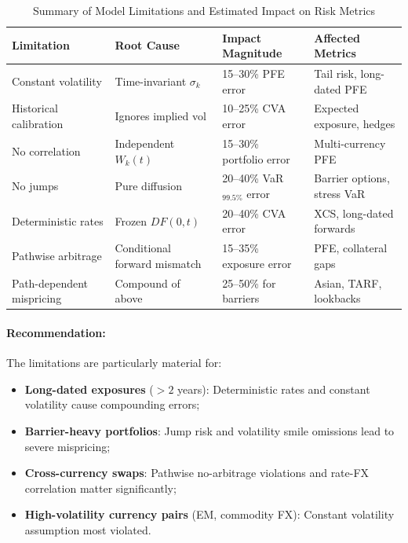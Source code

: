 \begin{table}[h!]
	\centering
	\small
	\begin{tabular}{|p{4cm}|p{3.5cm}|p{3cm}|p{3cm}|}
		\hline
		\textbf{Limitation} & \textbf{Root Cause} & \textbf{Impact Magnitude} & \textbf{Affected Metrics} \\
		\hline
		Constant volatility & Time-invariant $\sigma_k$ & 15--30\% PFE error & Tail risk, long-dated PFE \\
		\hline
		Historical calibration & Ignores implied vol & 10--25\% CVA error & Expected exposure, hedges \\
		\hline
		No correlation & Independent $W_k(t)$ & 15--30\% portfolio error & Multi-currency PFE \\
		\hline
		No jumps & Pure diffusion & 20--40\% VaR$_{99.5\%}$ error & Barrier options, stress VaR \\
		\hline
		Deterministic rates & Frozen $DF(0,t)$ & 20--40\% CVA error & XCS, long-dated forwards \\
		\hline
		Pathwise arbitrage & Conditional forward mismatch & 15--35\% exposure error & PFE, collateral gaps \\
		\hline
		Path-dependent mispricing & Compound of above & 25--50\% for barriers & Asian, TARF, lookbacks \\
		\hline
	\end{tabular}
	\caption{Summary of Model Limitations and Estimated Impact on Risk Metrics}
	\label{tab:limitations_summary}
\end{table}

\paragraph{Recommendation:}
The limitations are particularly material for:
\begin{itemize}
	\item \textbf{Long-dated exposures} ($>2$ years): Deterministic rates and constant volatility cause compounding errors;
	\item \textbf{Barrier-heavy portfolios}: Jump risk and volatility smile omissions lead to severe mispricing;
	\item \textbf{Cross-currency swaps}: Pathwise no-arbitrage violations and rate-FX correlation matter significantly;
	\item \textbf{High-volatility currency pairs} (EM, commodity FX): Constant volatility assumption most violated.
\end{itemize}

